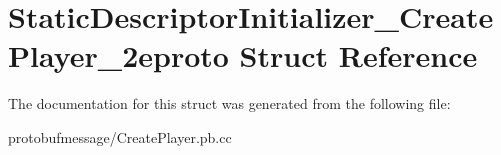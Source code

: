 \hypertarget{struct_static_descriptor_initializer___create_player__2eproto}{\section{Static\-Descriptor\-Initializer\-\_\-\-Create\-Player\-\_\-2eproto Struct Reference}
\label{struct_static_descriptor_initializer___create_player__2eproto}
}


The documentation for this struct was generated from the following file\-:\begin{DoxyCompactItemize}
\item 
protobufmessage/Create\-Player.\-pb.\-cc\end{DoxyCompactItemize}
